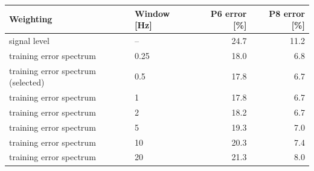 \begin{tabular}{llrr}\toprule
Weighting & Window [Hz] & P6 error [\%] & P8 error [\%]\\\midrule
signal level & -- & 24.7 & 11.2\\
training error spectrum & 0.25 & 18.0 & 6.8\\
training error spectrum (selected) & 0.5 & 17.8 & 6.7\\
training error spectrum & 1 & 17.8 & 6.7\\
training error spectrum & 2 & 18.2 & 6.7\\
training error spectrum & 5 & 19.3 & 7.0\\
training error spectrum & 10 & 20.3 & 7.4\\
training error spectrum & 20 & 21.3 & 8.0\\
\bottomrule\end{tabular}
